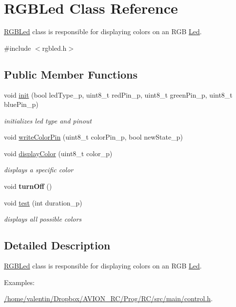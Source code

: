 \hypertarget{class_r_g_b_led}{}\section{R\+G\+B\+Led Class Reference}
\label{class_r_g_b_led}


\hyperlink{class_r_g_b_led}{R\+G\+B\+Led} class is responsible for displaying colors on an R\+GB \hyperlink{class_led}{Led}.  




{\ttfamily \#include $<$rgbled.\+h$>$}

\subsection*{Public Member Functions}
\begin{DoxyCompactItemize}
\item 
void \hyperlink{class_r_g_b_led_aa12ca52b63da78e35b6bbec3624df991}{init} (bool led\+Type\+\_\+p, uint8\+\_\+t red\+Pin\+\_\+p, uint8\+\_\+t green\+Pin\+\_\+p, uint8\+\_\+t blue\+Pin\+\_\+p)
\begin{DoxyCompactList}\small\item\em initializes led type and pinout \end{DoxyCompactList}\item 
void \hyperlink{class_r_g_b_led_a9ab9701eb0f4d945fd9ca6e2235d7ee9}{write\+Color\+Pin} (uint8\+\_\+t color\+Pin\+\_\+p, bool new\+State\+\_\+p)
\item 
void \hyperlink{class_r_g_b_led_a6a1e12a1f48fc29acd30aa88a1cfd1b1}{display\+Color} (uint8\+\_\+t color\+\_\+p)
\begin{DoxyCompactList}\small\item\em displays a specific color \end{DoxyCompactList}\item 
\mbox{\label{class_r_g_b_led_af00b4e0ef8ec0aea4452fc2133b03453}} 
void {\bfseries turn\+Off} ()
\item 
void \hyperlink{class_r_g_b_led_ab5c88bff636d49c1eaa34e75f6b4e380}{test} (int duration\+\_\+p)
\begin{DoxyCompactList}\small\item\em displays all possible colors \end{DoxyCompactList}\end{DoxyCompactItemize}


\subsection{Detailed Description}
\hyperlink{class_r_g_b_led}{R\+G\+B\+Led} class is responsible for displaying colors on an R\+GB \hyperlink{class_led}{Led}. \begin{Desc}
\item[Examples\+: ]\par
\hyperlink{_2home_2valentin_2_dropbox_2_a_v_i_o_n__r_c_2_prog_2_r_c_2src_2main_2control_8h-example}{/home/valentin/\+Dropbox/\+A\+V\+I\+O\+N\+\_\+\+R\+C/\+Prog/\+R\+C/src/main/control.\+h}.\end{Desc}


